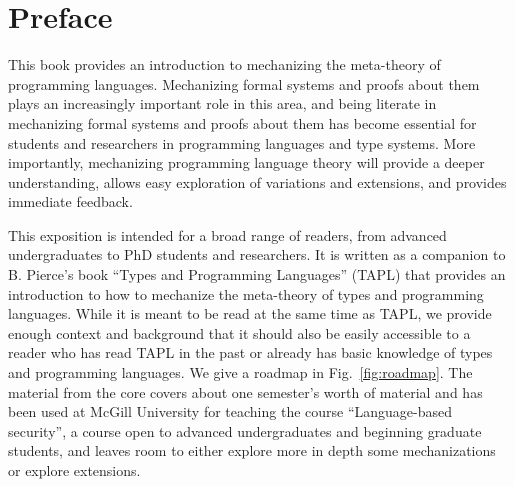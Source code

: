 \chapter*{Preface}
This book provides an introduction to mechanizing the meta-theory of programming languages. Mechanizing formal systems and proofs about them plays an increasingly important role in this area, and being literate in mechanizing formal systems and proofs about them  has become essential for students and researchers in programming languages and type systems. More importantly, mechanizing programming language theory will provide a deeper understanding, allows easy  exploration of variations and extensions, and provides immediate feedback.

This exposition is intended for a broad range of readers, from
advanced undergraduates to PhD students and researchers.  It is
written as a companion to B. Pierce's book ``Types and Programming
Languages'' (TAPL) that provides an introduction to how to mechanize
the meta-theory of types and programming languages. While it is meant
to be read  at the same time as TAPL, we provide enough context and
background that it should also be easily accessible to a reader who
has read TAPL in the past or already has basic knowledge of types and
programming languages. We give a roadmap in Fig.~\ref{fig:roadmap}. The material from the core covers about one semester's worth of material and has been used at McGill University for teaching the course ``Language-based security'', a course open to advanced undergraduates and beginning graduate students, and leaves room to either explore more in depth some mechanizations or explore extensions.



